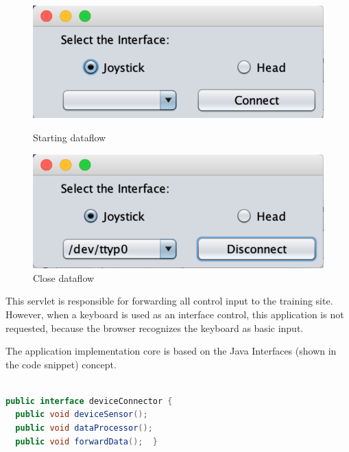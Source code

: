 \begin{figure}[!htbp]
\center
\begin{minipage}{0.45\linewidth}
\center
\captionsetup{justification=centering,margin=0.5cm,font=small}
\includegraphics[width=1\linewidth]{img/cap5/dataAcquisition01}
\caption{Starting dataflow} \label{fig:dataAcquisition01}
\end{minipage}
\begin{minipage}{0.45\linewidth}
\center
\captionsetup{justification=centering,margin=0cm,font=small}
\includegraphics[width=1\linewidth]{img/cap5/dataAcquisition02}
\caption{Close dataflow} \label{fig:dataAcquisition02}
\end{minipage}
\end{figure}

This servlet is responsible for forwarding all control input to the training site. However, when a keyboard is used as an interface control, this application is not requested, because the browser recognizes the keyboard as basic input. 

The application implementation core is based on the Java Interfaces (shown in the code snippet) concept. \newline

\begin{lstlisting}[frame=single,language=Java]  % Start your code-block

public interface deviceConnector {
  public void deviceSensor();
  public void dataProcessor();
  public void forwardData();  }
\end{lstlisting}


